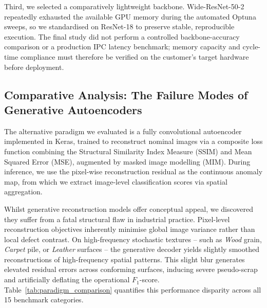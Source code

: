 Third, we selected a comparatively lightweight backbone. Wide-ResNet-50-2 repeatedly exhausted the available GPU memory during the automated Optuna sweeps, so we standardised on ResNet-18 to preserve stable, reproducible execution. The final study did not perform a controlled backbone-accuracy comparison or a production IPC latency benchmark; memory capacity and cycle-time compliance must therefore be verified on the customer's target hardware before deployment.

\subsection{Comparative Analysis: The Failure Modes of Generative Autoencoders}

The alternative paradigm we evaluated is a fully convolutional autoencoder implemented in Keras, trained to reconstruct nominal images via a composite loss function combining the Structural Similarity Index Measure (SSIM) \cite{wang2004ssim} and Mean Squared Error (MSE), augmented by masked image modelling (MIM). During inference, we use the pixel-wise reconstruction residual as the continuous anomaly map, from which we extract image-level classification scores via spatial aggregation.

Whilst generative reconstruction models offer conceptual appeal, we discovered they suffer from a fatal structural flaw in industrial practice. Pixel-level reconstruction objectives inherently minimise global image variance rather than local defect contrast. On high-frequency stochastic textures -- such as \emph{Wood} grain, \emph{Carpet} pile, or \emph{Leather} surfaces -- the generative decoder yields slightly smoothed reconstructions of high-frequency spatial patterns. This slight blur generates elevated residual errors across conforming surfaces, inducing severe pseudo-scrap and artificially deflating the operational $F_1$-score. Table~\ref{tab:paradigm_comparison} quantifies this performance disparity across all 15 benchmark categories.

\begin{table}[b!]
\centering
\caption{Macro-averaged performance across all 15 MVTec AD categories under our strict zero-test-leakage protocol.}
\label{tab:paradigm_comparison}
\scriptsize
{}
\end{table}

